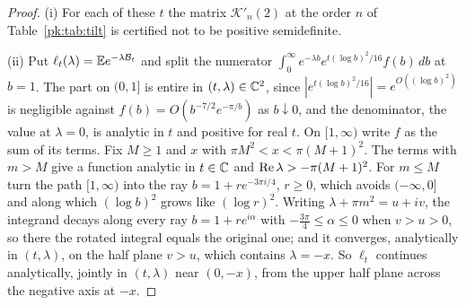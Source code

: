 \begin{proof}
(i) For each of these $t$ the matrix $\mathcal K'_n(2)$ at the order $n$ of Table~\ref{pk:tab:tilt} is certified not to be positive semidefinite.

(ii) Put $\ell_t(\lambda)=\mathbb{E} e^{-\lambda\mathcal B_t}$ and split the numerator $\int_0^\infty e^{-\lambda b}e^{t(\log b)^2/16}f(b)\,db$ at $b=1$. The part on $(0,1]$ is entire in $(t,\lambda)\in\mathbb{C}^2$, since $|e^{t(\log b)^2/16}|=e^{O((\log b)^2)}$ is negligible against $f(b)=O(b^{-7/2}e^{-\pi/b})$ as $b\downarrow0$, and the denominator, the value at $\lambda=0$, is analytic in $t$ and positive for real $t$. On $[1,\infty)$ write $f$ as the sum of its terms. Fix $M\ge1$ and $x$ with $\pi M^2<x<\pi(M+1)^2$. The terms with $m>M$ give a function analytic in $t\in\mathbb{C}$ and $\operatorname{Re}\lambda>-\pi(M+1)^2$. For $m\le M$ turn the path $[1,\infty)$ into the ray $b=1+re^{-3\pi i/4}$, $r\ge0$, which avoids $(-\infty,0]$ and along which $(\log b)^2$ grows like $(\log r)^2$. Writing $\lambda+\pi m^2=u+iv$, the integrand decays along every ray $b=1+re^{i\alpha}$ with $-\frac{3\pi}4\le\alpha\le0$ when $v>u>0$, so there the rotated integral equals the original one; and it converges, analytically in $(t,\lambda)$, on the half plane $v>u$, which contains $\lambda=-x$. So $\ell_t$ continues analytically, jointly in $(t,\lambda)$ near $(0,-x)$, from the upper half plane across the negative axis at $-x$.


\end{proof}
